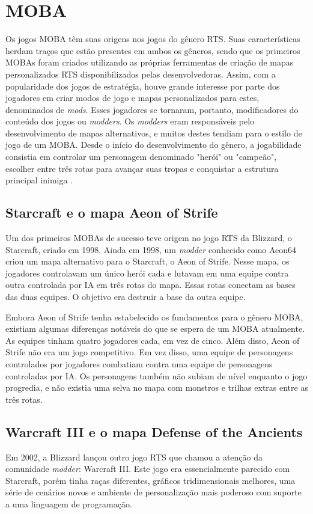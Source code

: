 \section{MOBA}
Os jogos MOBA têm suas origens nos jogos do gênero RTS. Suas características herdam traços que estão presentes em ambos os gêneros, sendo que os primeiros MOBAs foram criados utilizando as próprias ferramentas de criação de mapas personalizados RTS disponibilizados pelas desenvolvedoras. Assim, com a popularidade dos jogos de estratégia, houve grande interesse por parte dos jogadores em criar modos de jogo e mapas personalizados para estes, denominados de \textit{mods}. Esses jogadores se tornaram, portanto, modificadores do conteúdo dos jogos ou \textit{modders}. Os \textit{modders} eram responsáveis pelo desenvolvimento de mapas alternativos, e muitos destes tendiam para o estilo de jogo de um MOBA. Desde o início do desenvolvimento do gênero, a jogabilidade consistia em controlar um personagem denominado "herói" ou "campeão", escolher entre três rotas para avançar suas tropas e conquistar a estrutura principal inimiga \cite{do2016desenvolvimento} \cite{ferrari2013generative} \cite{minotti2014history}.

\subsection{Starcraft e o mapa Aeon of Strife}
Um dos primeiros MOBAs de sucesso teve origem no jogo RTS da Blizzard, o Starcraft, criado em 1998. Ainda em 1998, um \textit{modder} conhecido como Aeon64 criou um mapa alternativo para o Starcraft, o Aeon of Strife. Nesse mapa, os jogadores controlavam um único herói cada e lutavam em uma equipe contra outra controlada por IA em três rotas do mapa. Essas rotas conectam as bases das duas equipes. O objetivo era destruir a base da outra equipe.

Embora Aeon of Strife tenha estabelecido os fundamentos para o gênero MOBA, existiam algumas diferenças notáveis do que se espera de um MOBA atualmente. As equipes tinham quatro jogadores cada, em vez de cinco. Além disso, Aeon of Strife não era um jogo competitivo. Em vez disso, uma equipe de personagens controlados por jogadores combatiam contra uma equipe de personagens controladas por IA. Os personagens também não subiam de nível enquanto o jogo progredia, e não existia uma selva no mapa com monstros e trilhas extras entre as três rotas.

\subsection{Warcraft III e o mapa Defense of the Ancients}
Em 2002, a Blizzard lançou outro jogo RTS que chamou a atenção da comunidade \textit{modder}: Warcraft III. Este jogo era essencialmente parecido com Starcraft, porém tinha raças diferentes, gráficos tridimensionais melhores, uma série de cenários novos e ambiente de personalização mais poderoso com suporte a uma linguagem de programação.


